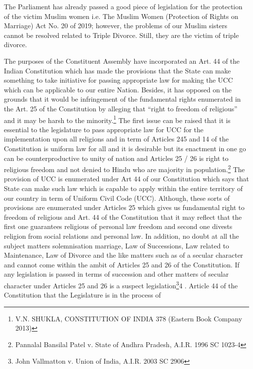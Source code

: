 \begin{multicols}{2}
The Parliament has already passed a good piece of legislation for the protection of the victim
Muslim women i.e. The Muslim Women (Protection of Rights on Marriage) Act No. 20 of
2019; however, the problems of our Muslim sisters cannot be resolved related to Triple
Divorce. Still, they are the victim of triple divorce. 


The purposes of the Constituent Assembly have incorporated an Art. 44 of the Indian
Constitution which has made the provisions that the State can make something to take
initiative for passing appropriate law for making the UCC which can be applicable to our
entire Nation. Besides, it has opposed on the grounds that it would be infringement of the
fundamental rights enumerated in the Art. 25 of the Constitution by alleging that “right to
freedom of religious” and it may be harsh to the minority.\footnote{V.N. SHUKLA, CONSTITUTION OF INDIA 378 (Eastern Book Company 2013)}
The first issue can be raised that it
is essential to the legislature to pass appropriate law for UCC for the implementation upon all
religions and in term of Articles 245 and 14 of the Constitution is uniform law for all and it is
desirable but its enactment in one go can be counterproductive to unity of nation and Articles
25 / 26 is right to religious freedom and not denied to Hindu who are majority in population.\footnote{Pannalal Bansilal Patel v. State of Andhra Pradesh, A.I.R. 1996 SC 1023-4}
The provision of UCC is enumerated under Art 44 of our Constitution which says that State
can make such law which is capable to apply within the entire territory of our country in term
of Uniform Civil Code (UCC). Although, these sorts of provisions are enumerated under
Articles 25 which gives us fundamental right to freedom of religious and Art. 44 of the
Constitution that it may reflect that the first one guarantees religious of personal law freedom
and second one divests religion from social relations and personal law. In addition, no doubt
at all the subject matters solemnisation marriage, Law of Successions, Law related to
Maintenance, Law of Divorce and the like matters such as of a secular character and cannot
come within the ambit of Articles 25 and 26 of the Constitution. If any legislation is passed in terms of succession and other matters of secular character under Articles 25 and 26 is a
suspect legislation\footnote{John Vallmatton v. Union of India, A.I.R. 2003 SC 2906}4
. Article 44 of the Constitution that the Legislature is in the process of

\end{multicols}

